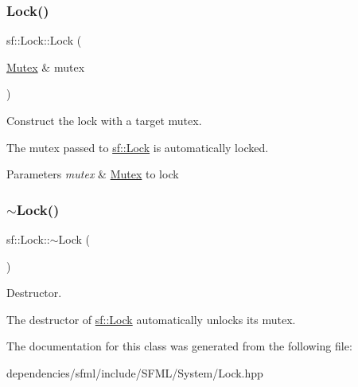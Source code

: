 \subsubsection{\texorpdfstring{Lock()}{Lock()}}
{\footnotesize\ttfamily sf\+::\+Lock\+::\+Lock (\begin{DoxyParamCaption}\item[{\hyperlink{classsf_1_1_mutex}{Mutex} \&}]{mutex }\end{DoxyParamCaption})\hspace{0.3cm}{\ttfamily [explicit]}}



Construct the lock with a target mutex. 

The mutex passed to \hyperlink{classsf_1_1_lock}{sf\+::\+Lock} is automatically locked.


\begin{DoxyParams}{Parameters}
{\em mutex} & \hyperlink{classsf_1_1_mutex}{Mutex} to lock \\
\hline
\end{DoxyParams}
\mbox{\label{classsf_1_1_lock_a8168b36323a18ccf5b6bc531d964aec5}} 
\subsubsection{\texorpdfstring{$\sim$\+Lock()}{~Lock()}}
{\footnotesize\ttfamily sf\+::\+Lock\+::$\sim$\+Lock (\begin{DoxyParamCaption}{ }\end{DoxyParamCaption})}



Destructor. 

The destructor of \hyperlink{classsf_1_1_lock}{sf\+::\+Lock} automatically unlocks its mutex. 

The documentation for this class was generated from the following file\+:\begin{DoxyCompactItemize}
\item 
dependencies/sfml/include/\+S\+F\+M\+L/\+System/Lock.\+hpp\end{DoxyCompactItemize}
